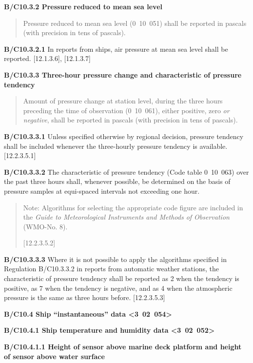 \textbf{B/C10.3.2 Pressure} \textbf{reduced to mean sea level}

\begin{quote}
Pressure reduced to mean sea level (0~10~051) shall be reported in pascals (with precision in tens of pascals).
\end{quote}

\textbf{B/C10.3.2.1} In reports from ships, air pressure at mean sea level shall be reported. {[}12.1.3.6{]}, {[}12.1.3.7{]}

\textbf{B/C10.3.3 Three-hour pressure change and characteristic of pressure tendency}

\begin{quote}
Amount of pressure change at station level, during the three hours preceding the time of observation (0~10~061), either positive, zero \emph{or negative}, shall be reported in pascals (with precision in tens of pascals).
\end{quote}

\textbf{B/C10.3.3.1} Unless specified otherwise by regional decision, pressure tendency shall be included whenever the three-hourly pressure tendency is available. {[}12.2.3.5.1{]}

\textbf{B/C10.3.3.2} The characteristic of pressure tendency (Code table 0~10~063) over the past three hours shall, whenever possible, be determined on the basis of pressure samples at equi-spaced intervals not exceeding one hour.

\begin{quote}
Note: Algorithms for selecting the appropriate code figure are included in the \emph{Guide to Meteorological Instruments and Methods of Observation} (WMO-No. 8).

{[}12.2.3.5.2{]}
\end{quote}

\textbf{B/C10.3.3.3} Where it is not possible to apply the algorithms specified in Regulation B/C10.3.3.2 in reports from automatic weather stations, the characteristic of pressure tendency shall be reported as 2 when the tendency is positive, as 7 when the tendency is negative, and as 4 when the atmospheric pressure is the same as three hours before. {[}12.2.3.5.3{]}

\textbf{B/C10.4 Ship ``instantaneous'' data \textless3~02~054\textgreater{}}

\textbf{B/C10.4.1 Ship temperature and humidity data \textless3~02~052\textgreater{}}

\textbf{B/C10.4.1.1 Height of sensor above marine deck platform and height of sensor above water surface}

